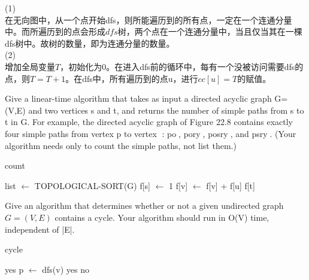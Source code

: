 \documentclass[a4paper, justified]{tufte-handout}
\begin{document}
\begin{solution}
(1)\\
在无向图中，从一个点开始dfs，则所能遍历到的所有点，一定在一个连通分量中。而所遍历到的点会形成$dfs$树，两个点在一个连通分量中，当且仅当其在一棵dfs树中。故树的数量，即为连通分量的数量。\\
(2)\\
增加全局变量$T$，初始化为$0$。在进入dfs前的循环中，每有一个没被访问需要dfs的点，则$T=T+1$。在dfs中，所有遍历到的点u，进行$cc[u]=T$的赋值。
\end{solution}

\newpage
\begin{problem}[TC 22.4-2]
Give a linear-time algorithm that takes as input a directed acyclic graph G=(V,E) and two vertices s and t, and returns the number of simple paths from s to t in G. For example, the directed acyclic graph of Figure 22.8 contains exactly four simple paths from vertex p to vertex 􏰁: po􏰁, pory􏰁, posry􏰁, and psry􏰁. (Your algorithm needs only to count the simple paths, not list them.)
\end{problem}

\begin{solution}
\noindent
\begin{algorithm}
\caption{count}\label{euclid}
\begin{algorithmic}[1]
\State list $\gets$ TOPOLOGICAL-SORT(G)
\State f[s] $\gets$ 1
		\State f[v] $\gets$ f[v] + f[u]
	\EndFor
\EndFor
\Return f[t]
\EndProcedure
\end{algorithmic}
\end{algorithm}
\end{solution}

\begin{problem}[TC 22.4-3]
Give an algorithm that determines whether or not a given undirected graph $G=(V,E)$ contains a cycle. Your algorithm should run in O(V) time, independent of |E|.
\end{problem}

\begin{solution}
\begin{algorithm}
\caption{cycle}\label{euclid}
\begin{algorithmic}[1]
	\State \Return yes
\EndIf
{}
		\State p $\gets$ dfs(v)
			\State \Return yes
		\EndIf
	\EndIf
\EndFor
\State \Return no
\EndProcedure
\end{algorithmic}
\end{algorithm}
\end{solution}
\end{document}
